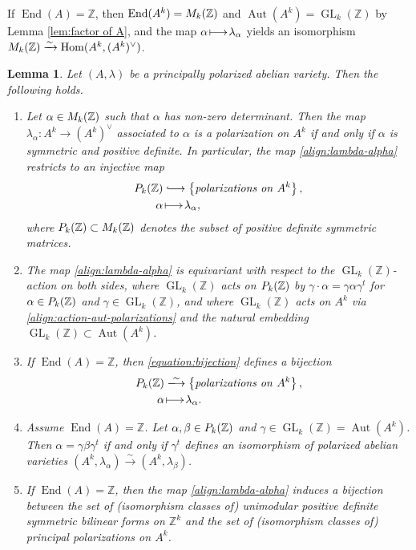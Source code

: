 \documentclass[a4paper,11pt,reqno]{amsart}
\makeatletter
\newcommand*{\longhookrightarrow}{\ensuremath{\lhook\joinrel\relbar\joinrel\rightarrow}}
\numberwithin{equation}{section}
\theoremstyle{plain}
\newtheorem{lemma}[theorem]{Lemma}
\theoremstyle{definition}
\newcommand{\Z}{\mathbb Z}
\newcommand{\tn}[1]{{\textnormal{#1}}}
\let\rm\relax
\newcommand{\rm}[1]{{\mathrm{#1}}}
\newcommand{\Hom}{\operatorname{Hom}}
\newcommand{\End}{\operatorname{End}}
\newcommand{\Aut}{\operatorname{Aut}}
\newcommand{\GL}{\operatorname{GL}}
\renewcommand{\mapsto}{\xymatrix@1@=15pt{\ar@{|->}[r]&}}
\newcommand{\set}[1]{\left\{ #1 \right\}}
\makeatother
\begin{document}
If $\End(A) =\Z$, then $\End(A^k) = \rm{M}_k(\Z)$ and $\Aut(A^k) = \GL_k(\Z)$ by Lemma \ref{lem:factor of A}, and the map $\alpha \mapsto \lambda_\alpha$ yields an isomorphism $\rm{M}_k(\Z) \xrightarrow{\sim} \Hom(A^k, (A^k)^\vee)$.  

\begin{lemma} \label{lemma:polarizationcorrespondence}
Let $(A, \lambda)$ be a principally polarized abelian variety. Then the following holds.
\begin{enumerate}
\item \label{item:polarizationcorrespondence-0} Let $\alpha \in \rm{M}_k(\Z)$ such that $\alpha$ has non-zero determinant. Then the map $\lambda_\alpha \colon A^k \to (A^k)^\vee$ associated to $\alpha$ is a polarization on $A^k$ if and only if $\alpha$ is symmetric and positive definite. In particular, the map \eqref{align:lambda-alpha} restricts to an injective map
\begin{align}
\label{equation:bijection}
\begin{split}
\rm{P}_k(\Z) &\longhookrightarrow
\set{\tn{\emph{polarizations on} $A^k$}}, \\ \alpha &\mapsto \lambda_\alpha,
\end{split}
\end{align}
where $\rm{P}_k(\Z) \subset \rm{M}_k(\Z)$ denotes the subset of positive definite symmetric matrices. 
\item \label{item:polarizationcorrespondence-2}
The map \eqref{align:lambda-alpha} is equivariant with respect to the $\GL_k(\Z)$-action on both sides, where $\GL_k(\Z)$ acts on $\rm{P}_k(\Z)$ by $\gamma \cdot \alpha = \gamma \alpha \gamma^t$ for $\alpha \in \rm{P}_k(\Z)$ and $\gamma \in \GL_k(\Z)$, and where $\GL_k(\Z)$ acts on $A^k$ via \eqref{align:action-aut-polarizations} and the natural embedding $\GL_k(\Z) \subset \Aut(A^k)$. 
\item \label{item:polarizationcorrespondence-1} If $\End(A) = \Z$, then \eqref{equation:bijection} defines a bijection \begin{align}
\label{equation:bijection:ii}
\begin{split}
\rm{P}_k(\Z) &\xlongrightarrow{\sim}
\set{\tn{\emph{polarizations on} $A^k$}}, \\ \alpha &\mapsto \lambda_\alpha.
\end{split}
\end{align} 
\item \label{item:polarizationcorrespondence-4}
Assume $\End(A) = \Z$. Let $\alpha, \beta \in \rm{P}_k(\Z)$ and $\gamma \in \GL_k(\Z) = \Aut(A^k)$. Then $\alpha = \gamma \beta \gamma^t$ if and only if $\gamma^t$ defines an isomorphism of polarized abelian varieties $(A^k, \lambda_\alpha) \xrightarrow{\sim}(A^k, \lambda_\beta)$.  
\item \label{item:polarizationcorrespondence-3} If $\End(A) = \Z$, then the map \eqref{align:lambda-alpha} induces a bijection between the set of (isomorphism classes of) unimodular positive definite symmetric bilinear forms on $\Z^k$ and the set of (isomorphism classes of) principal polarizations on $A^k$. 
\end{enumerate}
\end{lemma}
\end{document}
